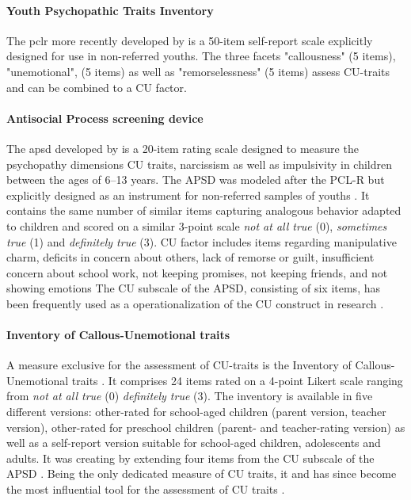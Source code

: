 \paragraph{Youth Psychopathic Traits Inventory}
The \gls{pclr} more recently developed by \textcites{andershed_psychopathic_2012} is a 50-item self-report scale explicitly designed for use in non-referred youths.
The three facets "callousness" (5 items), "unemotional", (5 items) as well as "remorselessness" (5 items) assess CU-traits and can be combined to a CU factor.

\paragraph{Antisocial Process screening device}
The \gls{apsd} developed by \textcites{frick_antisocial_2001} is a
20-item rating scale designed to measure the psychopathy dimensions CU traits, narcissism
as well as impulsivity in children between the ages of 6–13 years. The APSD was modeled after the PCL-R
but explicitly designed as an instrument for non-referred samples of youths  \parencite{andershed_psychopathic_2012}.
It contains the same number of similar items capturing analogous behavior adapted to children and scored on a similar 3-point scale \textit{not at all true} (0), 
\textit{sometimes true} (1) and \textit{definitely true} (3). 
CU factor includes items regarding manipulative charm, deficits in concern about others, lack of remorse or guilt, insufficient concern about school work, not keeping promises, not keeping friends, and not showing emotions
The CU subscale of the APSD, consisting of six items, has been frequently used as a operationalization of the CU construct in research \parencite{viding_callousunemotional_2018}.

\paragraph{Inventory of Callous-Unemotional traits}
A measure exclusive for the assessment of CU-traits is the Inventory of Callous-Unemotional traits \parencite{frick_icu_2004}. 
It comprises 24 items rated on a 4-point Likert scale ranging from \textit{not at all true} (0) \textit{definitely true} (3). 
The inventory is available in five different versions: other-rated for school-aged children (parent version, teacher version), 
other-rated for preschool children (parent- and teacher-rating version) as well as a self-report version suitable for school-aged children, adolescents and adults.
It was creating by extending four items from the CU subscale of the APSD \parencite{kimonis_using_2015}.
Being the only dedicated measure of CU traits, it and has since become the most influential tool for the assessment of CU traits
\parencite{cardinale_reliability_2017}.

